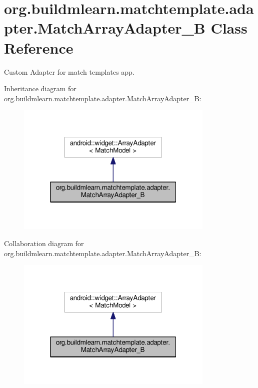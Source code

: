 \hypertarget{classorg_1_1buildmlearn_1_1matchtemplate_1_1adapter_1_1MatchArrayAdapter__B}{}\section{org.\+buildmlearn.\+matchtemplate.\+adapter.\+Match\+Array\+Adapter\+\_\+B Class Reference}
\label{classorg_1_1buildmlearn_1_1matchtemplate_1_1adapter_1_1MatchArrayAdapter__B}


Custom Adapter for match template\textquotesingle{}s app.  




Inheritance diagram for org.\+buildmlearn.\+matchtemplate.\+adapter.\+Match\+Array\+Adapter\+\_\+B\+:
\nopagebreak
\begin{figure}[H]
\begin{center}
\leavevmode
\includegraphics[width=268pt]{classorg_1_1buildmlearn_1_1matchtemplate_1_1adapter_1_1MatchArrayAdapter__B__inherit__graph}
\end{center}
\end{figure}


Collaboration diagram for org.\+buildmlearn.\+matchtemplate.\+adapter.\+Match\+Array\+Adapter\+\_\+B\+:
\nopagebreak
\begin{figure}[H]
\begin{center}
\leavevmode
\includegraphics[width=268pt]{classorg_1_1buildmlearn_1_1matchtemplate_1_1adapter_1_1MatchArrayAdapter__B__coll__graph}
\end{center}
\end{figure}
